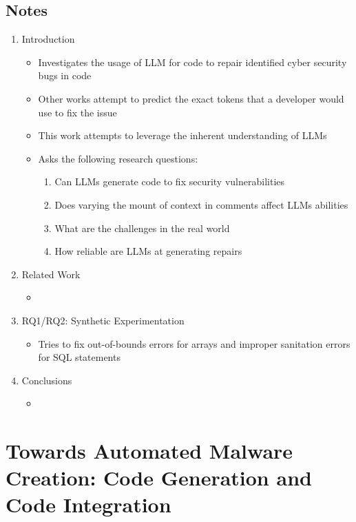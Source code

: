 \documentclass{article}
\begin{document}
\subsection*{Notes}

\begin{enumerate}
	\item Introduction
	\begin{itemize}
		\item Investigates the usage of LLM for code to repair identified cyber security bugs in code
		\item Other works attempt to predict the exact tokens that a developer would use to fix the issue
		\item This work attempts to leverage the inherent understanding of LLMs
		\item Asks the following research questions:
		\begin{enumerate}
			\item Can LLMs generate code to fix security vulnerabilities
			\item Does varying the mount of context in comments affect LLMs abilities
			\item What are the challenges in the real world
			\item How reliable are LLMs at generating repairs
		\end{enumerate}
	\end{itemize}
	\item Related Work
	\begin{itemize}
		\item 
	\end{itemize}
	\item RQ1/RQ2: Synthetic Experimentation
	\begin{itemize}
		\item Tries to fix out-of-bounds errors for arrays and improper sanitation errors for SQL statements
	\end{itemize}
	\item Conclusions
	\begin{itemize}
		\item 
	\end{itemize}
\end{enumerate}



\pagebreak

\section*{Towards Automated Malware Creation: Code Generation and Code Integration}
\end{document}
